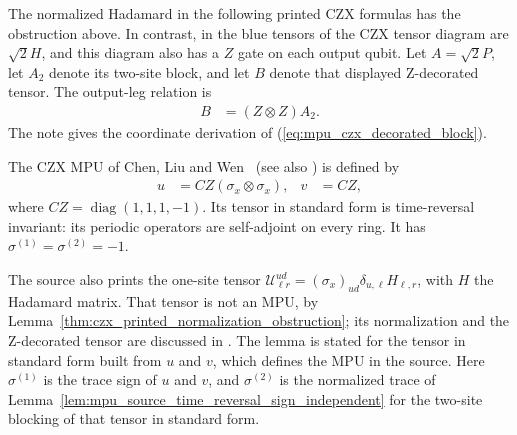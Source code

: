 \begin{remark}
    The normalized Hadamard in the following printed CZX formulas has
    the obstruction above. In contrast, in \cite{FrancoRubio2025MPUGauging} the blue tensors of
    the CZX tensor diagram
    are $\sqrt{2}H$, and this diagram also has a $Z$ gate on each
    output qubit. Let $A=\sqrt2 P$, let $A_2$ denote its two-site block,
    and let $B$ denote that displayed Z-decorated tensor. The output-leg
    relation is
    \begin{align}
        B & =(Z\otimes Z)A_2.
        \label{eq:mpu_czx_decorated_block}
    \end{align}
    The note \cite{gap:mpu_czx_tensor_normalization} gives the coordinate derivation of
    (\ref{eq:mpu_czx_decorated_block}).
\end{remark}

\begin{lemma}[CZX]
    \label{example:czx}
    \leanok
    The CZX MPU of Chen, Liu and Wen~\cite{ChenLiuWen2011CZX} (see also
    \cite[lines~1906--1943]{Cirac2017MPU}) is defined by
    \begin{align}
        u & =CZ(\sigma_x\otimes\sigma_x), & v & =CZ,
    \end{align}
    where $CZ=\operatorname{diag}(1,1,1,-1)$. Its tensor in standard form
    is time-reversal invariant: its periodic operators are self-adjoint on
    every ring. It has $\sigma^{(1)}=\sigma^{(2)}=-1$.

    The source also prints the one-site tensor
    $\mathcal U_{\ell r}^{ud}=(\sigma_x)_{ud}\delta_{u,\ell}H_{\ell,r}$, with
    $H$ the Hadamard matrix. That tensor is not an MPU, by
    Lemma~\ref{thm:czx_printed_normalization_obstruction}; its normalization
    and the Z-decorated tensor are discussed in
    \cite{gap:mpu_czx_tensor_normalization}. The lemma is stated for the
    tensor in standard form built from $u$ and $v$, which defines the MPU in
    the source. Here $\sigma^{(1)}$ is the trace sign of $u$ and $v$, and
    $\sigma^{(2)}$ is the normalized trace of
    Lemma~\ref{lem:mpu_source_time_reversal_sign_independent} for the
    two-site blocking of that tensor in standard form.
\end{lemma}

